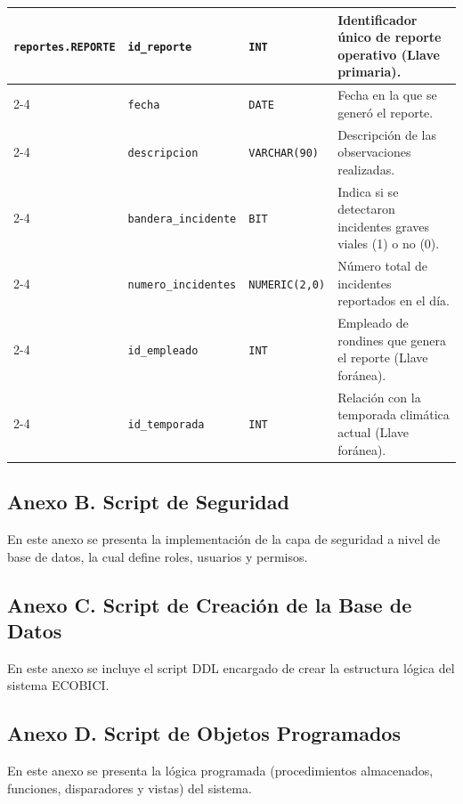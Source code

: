 \begin{longtable}{|p{3.2cm}|p{2.7cm}|p{3.0cm}|p{6.0cm}|}
	\texttt{reportes.REPORTE} & \texttt{id\_reporte} & \texttt{INT} & Identificador único de reporte operativo (Llave primaria). \\ \cline{2-4}
	& \texttt{fecha} & \texttt{DATE} & Fecha en la que se generó el reporte. \\ \cline{2-4}
	& \texttt{descripcion} & \texttt{VARCHAR(90)} & Descripción de las observaciones realizadas. \\ \cline{2-4}
	& \texttt{bandera\_incidente} & \texttt{BIT} & Indica si se detectaron incidentes graves viales (1) o no (0). \\ \cline{2-4}
	& \texttt{numero\_incidentes} & \texttt{NUMERIC(2,0)} & Número total de incidentes reportados en el día. \\ \cline{2-4}
	& \texttt{id\_empleado} & \texttt{INT} & Empleado de rondines que genera el reporte (Llave foránea). \\ \cline{2-4}
	& \texttt{id\_temporada} & \texttt{INT} & Relación con la temporada climática actual (Llave foránea). \\ \hline
\end{longtable}
\endgroup

\newpage

\subsection{Anexo B. Script de Seguridad}
\label{sec:anexo_b}
En este anexo se presenta la implementación de la capa de seguridad a nivel de base de datos, la cual define roles, usuarios y permisos.



\newpage

\subsection{Anexo C. Script de Creación de la Base de Datos}
\label{sec:anexo_c}
En este anexo se incluye el script DDL encargado de crear la estructura lógica del sistema ECOBICI.



\newpage

\subsection{Anexo D. Script de Objetos Programados}
\label{sec:anexo_d}
En este anexo se presenta la lógica programada (procedimientos almacenados, funciones, disparadores y vistas) del sistema.

